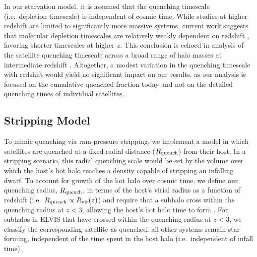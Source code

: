\documentclass[usenatbib]{mn2e}
\begin{document}
In our starvation model, it is assumed that the quenching timescale
(i.e.~depletion timescale) is independent of cosmic time. While
studies at higher redshift are limited to significantly more massive
systems, current work suggests that molecular depletion timescales are
relatively weakly dependent on redshift \citep{geach11, magdis12a,
  saintogne13, bauermeister13}, favoring shorter timescales at higher
$z$. This conclusion is echoed in analysis of the satellite quenching
timescale across a broad range of halo masses at intermediate redshift
\citep{mcgee11, mcgee14, mok14, muzzin14, bahe15}. Altogether, a
modest variation in the quenching timescale with redshift would yield
no significant impact on our results, as our analysis is focused on
the cumulative quenched fraction today and not on the detailed
quenching times of individual satellites.







\subsection{Stripping Model}
\label{subsec:rquench}

To mimic quenching via ram-pressure stripping, we implement a model in
which satellites are quenched at a fixed radial distance ($R_{\rm
  quench}$) from their host. In a stripping scenario, this radial
quenching scale would be set by the volume over which the host's hot
halo reaches a density capable of stripping an infalling dwarf. To
account for growth of the hot halo over cosmic time, we define our
quenching radius, $R_{\rm quench}$, in terms of the host's virial
radius as a function of redshift (i.e.~$R_{\rm quench} \propto R_{\rm
  vir}(z)$) and require that a subhalo cross within the quenching
radius at $z < 3$, allowing the host's hot halo time to form
\citep{birnboim03, keres05, dekel06}. For subhalos in ELVIS that have
crossed within the quenching radius at $z < 3$, we classify the
corresponding satellite as quenched; all other systems remain
star-forming, independent of the time spent in the host halo
(i.e.~independent of infall time).
\end{document}
